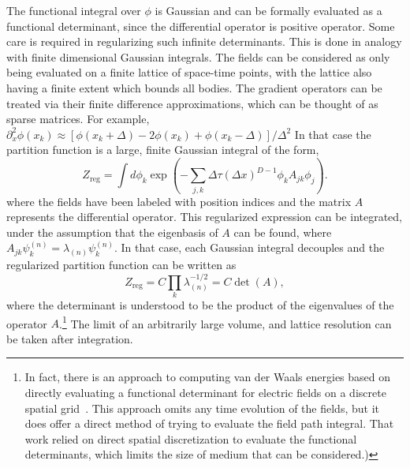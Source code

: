 The functional integral over $\phi$ is Gaussian and can be formally evaluated as a 
functional determinant, since the differential operator is positive operator.  
Some care is required in regularizing such infinite determinants.
This is done in analogy with finite dimensional Gaussian integrals.  
The fields can be considered as only being evaluated on a finite lattice of space-time points,
with the lattice also having a finite extent which bounds all bodies.  
The gradient operators can be treated via their finite difference approximations, 
which can be thought of as sparse matrices.
For example, $\partial_x^2\phi(x_k) \approx [\phi(x_k+\Delta)-2\phi(x_k)+\phi(x_k-\Delta)]/\Delta^2$
In that case the partition function is a large, finite Gaussian integral of the form, 
\begin{equation}
  Z_{\text{reg}} = \int d\phi_k\exp\left(-\sum_{j,k}\Delta \tau (\Delta x)^{D-1}\phi_k A_{jk}\phi_j\right).
\end{equation}
where the fields have been labeled with position indices and the matrix $A$ represents the differential
operator.  
This regularized expression can be integrated, under the assumption that the eigenbasis of $A$ can be found,
where $A_{jk}\psi^{(n)}_k=\lambda_{(n)}\psi^{(n)}_k$.  In that case, each Gaussian integral decouples and the 
regularized partition function can be written as 
\begin{equation}
   Z_{\text{reg}} = C \prod_k \lambda_{(n)}^{-1/2} = C \det(A),
\end{equation}
where the determinant is understood to be the product of the eigenvalues of the operator $A$.\footnote{
In fact, there is an approach to computing van der Waals energies based on directly 
evaluating a functional determinant for electric fields on a discrete spatial grid~\citep{Maggs2006,Pasquali2008}. This approach 
omits any time evolution of the fields, but it does offer a direct method of trying to evaluate the field path integral.
That work relied on direct spatial discretization to evaluate the functional determinants, which limits
the size of medium that can be considered.)
}
The limit of an arbitrarily large volume, and lattice resolution can be taken after integration.

